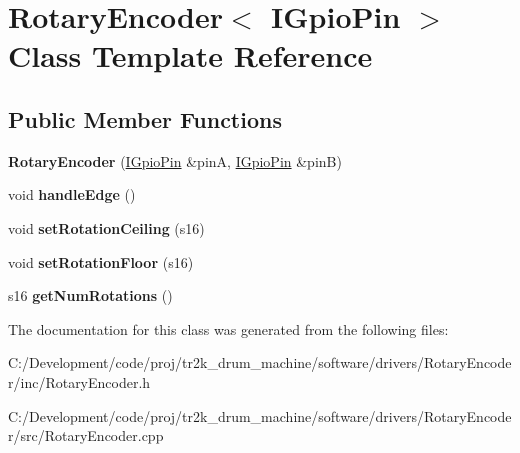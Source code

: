 \hypertarget{class_rotary_encoder}{}\section{Rotary\+Encoder$<$ I\+Gpio\+Pin $>$ Class Template Reference}
\label{class_rotary_encoder}
\subsection*{Public Member Functions}
\begin{DoxyCompactItemize}
\item 
\mbox{\label{class_rotary_encoder_a4dd277ba00fe46063f5778b202fa8414}} 
{\bfseries Rotary\+Encoder} (\mbox{\hyperlink{class_i_gpio_pin}{I\+Gpio\+Pin}} \&pinA, \mbox{\hyperlink{class_i_gpio_pin}{I\+Gpio\+Pin}} \&pinB)
\item 
\mbox{\label{class_rotary_encoder_af2d26ccf013052b3f223e40e0b4d6a9e}} 
void {\bfseries handle\+Edge} ()
\item 
\mbox{\label{class_rotary_encoder_a0074aa5a32961e08fcd89871f303939c}} 
void {\bfseries set\+Rotation\+Ceiling} (s16)
\item 
\mbox{\label{class_rotary_encoder_a04c456e6194eea6f69404243eff954af}} 
void {\bfseries set\+Rotation\+Floor} (s16)
\item 
\mbox{\label{class_rotary_encoder_aa5e3039a73f78b6c323f061e03dd0f8d}} 
s16 {\bfseries get\+Num\+Rotations} ()
\end{DoxyCompactItemize}


The documentation for this class was generated from the following files\+:\begin{DoxyCompactItemize}
\item 
C\+:/\+Development/code/proj/tr2k\+\_\+drum\+\_\+machine/software/drivers/\+Rotary\+Encoder/inc/Rotary\+Encoder.\+h\item 
C\+:/\+Development/code/proj/tr2k\+\_\+drum\+\_\+machine/software/drivers/\+Rotary\+Encoder/src/Rotary\+Encoder.\+cpp\end{DoxyCompactItemize}

